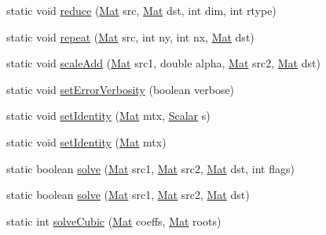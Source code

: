 \begin{DoxyCompactItemize}
\item 
static void \mbox{\hyperlink{classorg_1_1opencv_1_1core_1_1_core_a40f3b2f5156462a56912093ce7d9dc47}{reduce}} (\mbox{\hyperlink{classorg_1_1opencv_1_1core_1_1_mat}{Mat}} src, \mbox{\hyperlink{classorg_1_1opencv_1_1core_1_1_mat}{Mat}} dst, int dim, int rtype)
\item 
static void \mbox{\hyperlink{classorg_1_1opencv_1_1core_1_1_core_afcf15abfb6c9bf3a4126ae8199fc5ff3}{repeat}} (\mbox{\hyperlink{classorg_1_1opencv_1_1core_1_1_mat}{Mat}} src, int ny, int nx, \mbox{\hyperlink{classorg_1_1opencv_1_1core_1_1_mat}{Mat}} dst)
\item 
static void \mbox{\hyperlink{classorg_1_1opencv_1_1core_1_1_core_a5053d6e5d48e8df91d540032cbc5ed6c}{scale\+Add}} (\mbox{\hyperlink{classorg_1_1opencv_1_1core_1_1_mat}{Mat}} src1, double alpha, \mbox{\hyperlink{classorg_1_1opencv_1_1core_1_1_mat}{Mat}} src2, \mbox{\hyperlink{classorg_1_1opencv_1_1core_1_1_mat}{Mat}} dst)
\item 
static void \mbox{\hyperlink{classorg_1_1opencv_1_1core_1_1_core_a0932c141d51242fd49448aa6d4013101}{set\+Error\+Verbosity}} (boolean verbose)
\item 
static void \mbox{\hyperlink{classorg_1_1opencv_1_1core_1_1_core_ae3f55d8eaa889edf706fb60874e92bd4}{set\+Identity}} (\mbox{\hyperlink{classorg_1_1opencv_1_1core_1_1_mat}{Mat}} mtx, \mbox{\hyperlink{classorg_1_1opencv_1_1core_1_1_scalar}{Scalar}} s)
\item 
static void \mbox{\hyperlink{classorg_1_1opencv_1_1core_1_1_core_a9907da2380a9f7de76f9a82dc168cf56}{set\+Identity}} (\mbox{\hyperlink{classorg_1_1opencv_1_1core_1_1_mat}{Mat}} mtx)
\item 
static boolean \mbox{\hyperlink{classorg_1_1opencv_1_1core_1_1_core_af6e1ab8eaa1618c30a16e38da739bbeb}{solve}} (\mbox{\hyperlink{classorg_1_1opencv_1_1core_1_1_mat}{Mat}} src1, \mbox{\hyperlink{classorg_1_1opencv_1_1core_1_1_mat}{Mat}} src2, \mbox{\hyperlink{classorg_1_1opencv_1_1core_1_1_mat}{Mat}} dst, int flags)
\item 
static boolean \mbox{\hyperlink{classorg_1_1opencv_1_1core_1_1_core_a59b5de8a604e0fc96345da475f356bd3}{solve}} (\mbox{\hyperlink{classorg_1_1opencv_1_1core_1_1_mat}{Mat}} src1, \mbox{\hyperlink{classorg_1_1opencv_1_1core_1_1_mat}{Mat}} src2, \mbox{\hyperlink{classorg_1_1opencv_1_1core_1_1_mat}{Mat}} dst)
\item 
static int \mbox{\hyperlink{classorg_1_1opencv_1_1core_1_1_core_ad5466c6635353bcb874f9fa8147c4368}{solve\+Cubic}} (\mbox{\hyperlink{classorg_1_1opencv_1_1core_1_1_mat}{Mat}} coeffs, \mbox{\hyperlink{classorg_1_1opencv_1_1core_1_1_mat}{Mat}} roots)

\end{DoxyCompactItemize}
